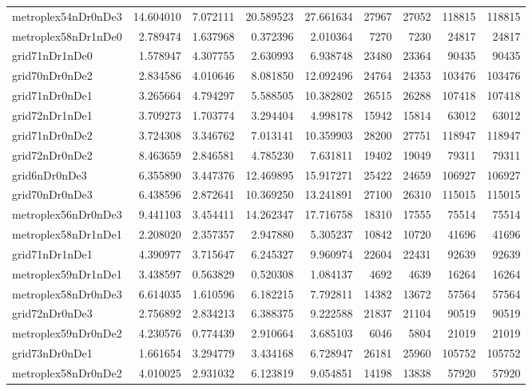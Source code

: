 \begin{longtable}{|l|r|r|r|r|r|r|r|r|}
metroplex54nDr0nDe3 & 14.604010 & 7.072111 & 20.589523 & 27.661634 & 27967 & 27052 & 118815 & 118815 \\
metroplex58nDr1nDe0 & 2.789474 & 1.637968 & 0.372396 & 2.010364 & 7270 & 7230 & 24817 & 24817 \\
grid71nDr1nDe0 & 1.578947 & 4.307755 & 2.630993 & 6.938748 & 23480 & 23364 & 90435 & 90435 \\
grid70nDr0nDe2 & 2.834586 & 4.010646 & 8.081850 & 12.092496 & 24764 & 24353 & 103476 & 103476 \\
grid71nDr0nDe1 & 3.265664 & 4.794297 & 5.588505 & 10.382802 & 26515 & 26288 & 107418 & 107418 \\
grid72nDr1nDe1 & 3.709273 & 1.703774 & 3.294404 & 4.998178 & 15942 & 15814 & 63012 & 63012 \\
grid71nDr0nDe2 & 3.724308 & 3.346762 & 7.013141 & 10.359903 & 28200 & 27751 & 118947 & 118947 \\
grid72nDr0nDe2 & 8.463659 & 2.846581 & 4.785230 & 7.631811 & 19402 & 19049 & 79311 & 79311 \\
grid6nDr0nDe3 & 6.355890 & 3.447376 & 12.469895 & 15.917271 & 25422 & 24659 & 106927 & 106927 \\
grid70nDr0nDe3 & 6.438596 & 2.872641 & 10.369250 & 13.241891 & 27100 & 26310 & 115015 & 115015 \\
metroplex56nDr0nDe3 & 9.441103 & 3.454411 & 14.262347 & 17.716758 & 18310 & 17555 & 75514 & 75514 \\
metroplex58nDr1nDe1 & 2.208020 & 2.357357 & 2.947880 & 5.305237 & 10842 & 10720 & 41696 & 41696 \\
grid71nDr1nDe1 & 4.390977 & 3.715647 & 6.245327 & 9.960974 & 22604 & 22431 & 92639 & 92639 \\
metroplex59nDr1nDe1 & 3.438597 & 0.563829 & 0.520308 & 1.084137 & 4692 & 4639 & 16264 & 16264 \\
metroplex58nDr0nDe3 & 6.614035 & 1.610596 & 6.182215 & 7.792811 & 14382 & 13672 & 57564 & 57564 \\
grid72nDr0nDe3 & 2.756892 & 2.834213 & 6.388375 & 9.222588 & 21837 & 21104 & 90519 & 90519 \\
metroplex59nDr0nDe2 & 4.230576 & 0.774439 & 2.910664 & 3.685103 & 6046 & 5804 & 21019 & 21019 \\
grid73nDr0nDe1 & 1.661654 & 3.294779 & 3.434168 & 6.728947 & 26181 & 25960 & 105752 & 105752 \\
metroplex58nDr0nDe2 & 4.010025 & 2.931032 & 6.123819 & 9.054851 & 14198 & 13838 & 57920 & 57920 \\

\end{longtable}
